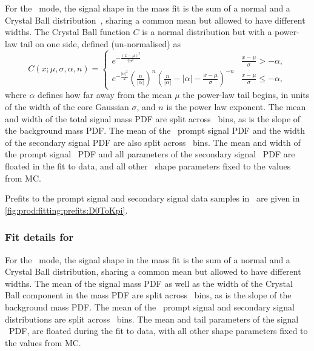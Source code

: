 For the \DzToKpi\ mode, the signal shape in the mass fit is the sum of a normal 
and a Crystal Ball distribution~\cite{Skwarnicki:1986xj}, sharing a common mean but allowed to have 
different widths.
The Crystal Ball function $C$ is a normal distribution but with a power-law 
tail on one side, defined (un-normalised) as
\begin{equation}
  C(x; \mu, \sigma, \alpha, n) = \begin{cases}
    e^{-\frac{{(x - \mu)}^{2}}{2\sigma^{2}}}                          & \frac{x - \mu}{\sigma} > -\alpha, \\
    e^{-\frac{|\alpha|^{2}}{2}}
      {(\frac{n}{|\alpha|})}^{n}
      {(\frac{n}{|\alpha|} - |\alpha| - \frac{x - \mu}{\sigma})}^{-n} & \frac{x - \mu}{\sigma} \leq -\alpha,
  \end{cases}
  \label{eqn:prod:fitting:crystal_ball}
\end{equation}
where $\alpha$ defines how far away from the mean $\mu$ the power-law tail 
begins, in units of the width of the core Gaussian $\sigma$, and $n$ is the 
power law exponent.
The mean and width of the total signal mass \ac{PDF} are split across \pTy\ 
bins, as is the slope of the background mass \ac{PDF}.
The mean of the \lnipchisq\ prompt signal \ac{PDF} and the width of the 
secondary signal \ac{PDF} are also split across \pTy\ bins.
The mean and width of the prompt signal \lnipchisq\ \ac{PDF} and all parameters 
of the secondary signal \lnipchisq\ \ac{PDF} are floated in the fit to data, 
and all other \lnipchisq\ shape parameters fixed to the values from \ac{MC}.

Prefits to the prompt signal and secondary signal data samples in \lnipchisq\ 
are given in \cref{fig:prod:fitting:prefits:D0ToKpi}.

\subsubsection*{Fit details for \PDplus}
\label{chap:prod:fitting:details:D0ToKpi}

For the \DpToKpipi\ mode, the signal shape in the mass fit is the sum of a 
normal and a Crystal Ball distribution, sharing a common mean but allowed to 
have different widths.
The mean of the signal mass \ac{PDF} as well as the width of the Crystal Ball 
component in the mass \ac{PDF} are split across \pTy\ bins, as is the slope of 
the background mass \ac{PDF}.
The mean of the \lnipchisq\ prompt signal and secondary signal distributions 
are split across \pTy\ bins.
The mean and tail parameters of the signal \lnipchisq\ \ac{PDF}, are floated 
during the fit to data, with all other shape parameters fixed to the values 
from \ac{MC}.

